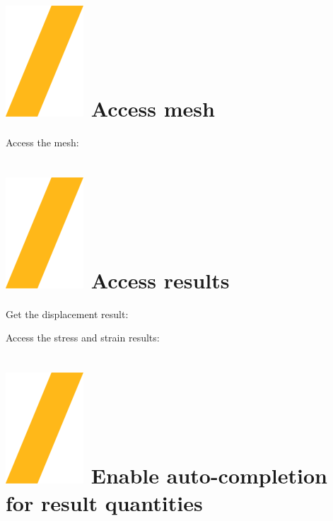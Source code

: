 \documentclass[9pt,landscape]{article}
\begin{document}
\begin{multicols}{3}
\section{\includegraphics[height=\fontcharht\font`\S]{slash.png} Access mesh}

Access the mesh:


\section{\includegraphics[height=\fontcharht\font`\S]{slash.png} Access results}

Get the displacement result:


Access the stress and strain results:



\vfill

\section{\includegraphics[height=\fontcharht\font`\S]{slash.png} Enable auto-completion for result quantities}


\end{multicols}
\end{document}
